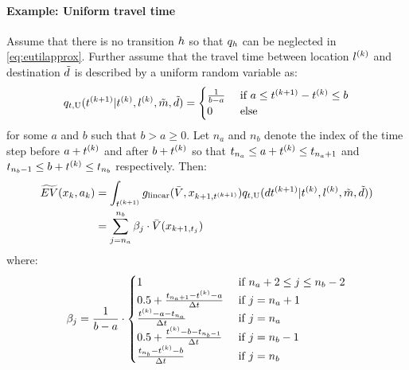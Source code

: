 \paragraph{Example: Uniform travel time}
Assume that there is no transition $h$ so that $q_h$ can be neglected in \eqref{eq:eutilapprox}. Further assume that the travel time between location $l^{(k)}$ and destination $\tilde{d}$ is described by a uniform random variable as:
\begin{equation*}
	q_{t,\text{U}}(t\ks{k+1}|t\ks{k},l\ks{k},\act{m},\act{d})=\begin{cases}
	\frac{1}{b-a} & \cif a \leq t\ks{k+1} - t\ks{k} \leq b \\
	0 & \celse
	\end{cases}
\end{equation*}
for some $a$ and $b$ such that $b> a \geq 0$. Let $n_a$ and $n_b$ denote the index of the time step before $a+t^{(k)}$ and after $b+t^{(k)}$ so that $t_{n_a} \leq a+t^{(k)} \leq t_{n_a+1}$ and $t_{n_b-1} \leq b+t^{(k)} \leq t_{n_b}$ respectively. Then:
\begin{equation*}
\begin{aligned}
\aeutil(x_k,a_k)&= \int_{t\ks{k+1}} g_\text{linear}(\ev,x_{k+1,t\ks{k+1}})q_{t,\text{U}}(dt\ks{k+1}|t\ks{k},l\ks{k},\act{m},\act{d}))\\
&=\sum_{j=n_a}^{n_b} \beta_j \cdot \ev(x_{k+1,t_j})
\end{aligned}
\end{equation*}
where:
\begin{equation*}
\beta_j = \frac{1}{b-a} \cdot \begin{cases}
1 & \cif n_a +2 \leq j \leq n_{b}-2 \\
0.5 + \frac{t_{n_a+1}-t\ks{k} - a}{\Delta t} & \cif j = n_a +1  \\
\frac{t\ks{k} - a -t_{n_a}}{\Delta t} & \cif j = n_a \\
0.5 + \frac{t\ks{k} - b -t_{n_{b}-1}}{\Delta t} & \cif j = n_{b}-1  \\
\frac{t_{n_b}-t\ks{k} - b}{\Delta t} & \cif j = n_b\\
\end{cases}
\end{equation*}

